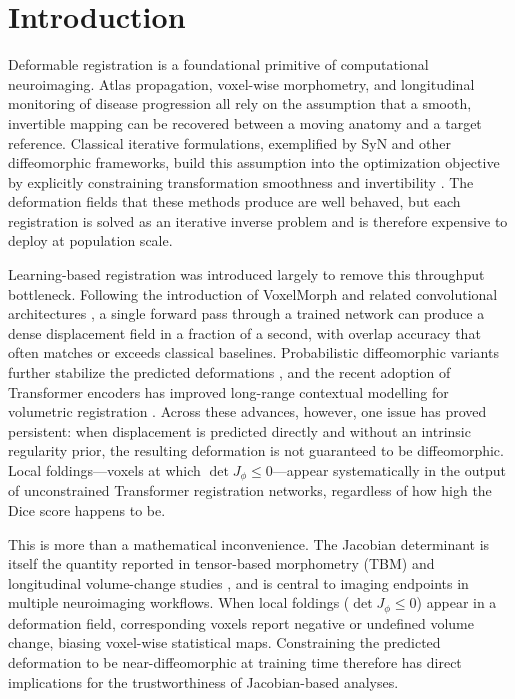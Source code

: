 \documentclass[jimaging,article,submit,pdftex,moreauthors]{Definitions/mdpi}
\begin{document}
\section{Introduction}

Deformable registration is a foundational primitive of computational neuroimaging. Atlas propagation, voxel-wise morphometry, and longitudinal monitoring of disease progression all rely on the assumption that a smooth, invertible mapping can be recovered between a moving anatomy and a target reference. Classical iterative formulations, exemplified by SyN and other diffeomorphic frameworks, build this assumption into the optimization objective by explicitly constraining transformation smoothness and invertibility \cite{avants2008ants,rueckert1999nonrigid,ashburner1999morphometry}. The deformation fields that these methods produce are well behaved, but each registration is solved as an iterative inverse problem and is therefore expensive to deploy at population scale.

Learning-based registration was introduced largely to remove this throughput bottleneck. Following the introduction of VoxelMorph and related convolutional architectures \cite{balakrishnan2019voxelmorph,kim2021cyclemorph}, a single forward pass through a trained network can produce a dense displacement field in a fraction of a second, with overlap accuracy that often matches or exceeds classical baselines. Probabilistic diffeomorphic variants further stabilize the predicted deformations \cite{dalca2019probreg}, and the recent adoption of Transformer encoders has improved long-range contextual modelling for volumetric registration \cite{chen2022transmorph,liu2021swin}. Across these advances, however, one issue has proved persistent: when displacement is predicted directly and without an intrinsic regularity prior, the resulting deformation is not guaranteed to be diffeomorphic. Local foldings---voxels at which \(\det J_\phi\le 0\)---appear systematically in the output of unconstrained Transformer registration networks, regardless of how high the Dice score happens to be.

This is more than a mathematical inconvenience. The Jacobian determinant is itself the quantity reported in tensor-based morphometry (TBM) and longitudinal volume-change studies \cite{leow2007tbm,ashburner1999morphometry}, and is central to imaging endpoints in multiple neuroimaging workflows. When local foldings (\(\det J_\phi\le 0\)) appear in a deformation field, corresponding voxels report negative or undefined volume change, biasing voxel-wise statistical maps. Constraining the predicted deformation to be near-diffeomorphic at training time therefore has direct implications for the trustworthiness of Jacobian-based analyses.
\end{document}
